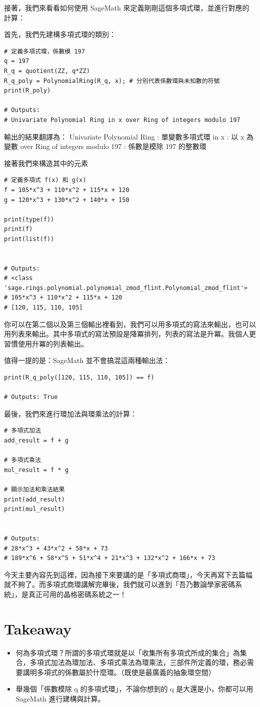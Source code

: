\documentclass[
]{article}
\providecommand{\tightlist}{%
  \setlength{\itemsep}{0pt}\setlength{\parskip}{0pt}}
\begin{document}
接著，我們來看看如何使用 SageMath
來定義剛剛這個多項式環，並進行對應的計算：

首先，我們先建構多項式環的類別：

\begin{verbatim}
# 定義多項式環，係數模 197
q = 197
R_q = quotient(ZZ, q*ZZ)
R_q_poly = PolynomialRing(R_q, x); # 分別代表係數環與未知數的符號
print(R_poly)

# Outputs:
# Univariate Polynomial Ring in x over Ring of integers modulo 197
\end{verbatim}

輸出的結果翻譯為： Univariate Polynomial Ring : 單變數多項式環 in x : 以
x 為變數 over Ring of integers modulo 197 : 係數是模除 197 的整數環

接著我們來構造其中的元素

\begin{verbatim}
# 定義多項式 f(x) 和 g(x)
f = 105*x^3 + 110*x^2 + 115*x + 120
g = 120*x^3 + 130*x^2 + 140*x + 150

print(type(f))
print(f)
print(list(f))


# Outputs:
# <class 'sage.rings.polynomial.polynomial_zmod_flint.Polynomial_zmod_flint'>
# 105*x^3 + 110*x^2 + 115*x + 120
# [120, 115, 110, 105]
\end{verbatim}

你可以在第二個以及第三個輸出裡看到，我們可以用多項式的寫法來輸出，也可以用列表來輸出。其中多項式的寫法預設是降冪排列，列表的寫法是升冪。我個人更習慣使用升冪的列表輸出。

值得一提的是：SageMath 並不會搞混這兩種輸出法：

\begin{verbatim}
print(R_q_poly([120, 115, 110, 105]) == f)

# Outputs: True
\end{verbatim}

最後，我們來進行環加法與環乘法的計算：

\begin{verbatim}
# 多項式加法
add_result = f + g

# 多項式乘法
mul_result = f * g

# 顯示加法和乘法結果
print(add_result)
print(mul_result)


# Outputs:
# 28*x^3 + 43*x^2 + 58*x + 73
# 189*x^6 + 58*x^5 + 51*x^4 + 21*x^3 + 132*x^2 + 166*x + 73
\end{verbatim}

今天主要內容先到這裡，因為接下來要講的是「多項式商環」，今天再寫下去篇幅就不夠了。而多項式商環講解完畢後，我們就可以進到「吾乃數論學家密碼系統」，是真正可用的晶格密碼系統之一！

\hypertarget{takeaway}{%
\section{Takeaway}\label{takeaway}}

\begin{itemize}
\tightlist
\item
  何為多項式環？所謂的多項式環就是以「收集所有多項式所成的集合」為集合，多項式加法為環加法、多項式乘法為環乘法，三部件所定義的環，務必需要講明多項式的係數屬於什麼環。（既使是最廣義的抽象環空間）
\item
  舉幾個「係數模除 q 的多項式環」，不論你想到的 q 是大還是小，你都可以用
  SageMath 進行建構與計算。
\end{itemize}
\end{document}
